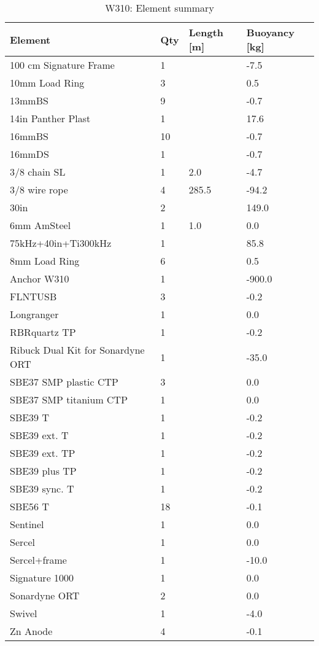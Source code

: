 \documentclass{article}
\begin{document}
\begin{table}[!htbp]
\centering
\caption{W310: Element summary}
\begin{tabular}{llll}
\toprule
Element & Qty & Length [m] & Buoyancy [kg] \\
\midrule
100 cm Signature Frame & 1 &  & -7.5 \\
10mm Load Ring & 3 &  & 0.5 \\
13mmBS & 9 &  & -0.7 \\
14in Panther Plast & 1 &  & 17.6 \\
16mmBS & 10 &  & -0.7 \\
16mmDS & 1 &  & -0.7 \\
3/8 chain SL & 1 & 2.0 & -4.7 \\
3/8 wire rope & 4 & 285.5 & -94.2 \\
30in & 2 &  & 149.0 \\
6mm AmSteel & 1 & 1.0 & 0.0 \\
75kHz+40in+Ti300kHz & 1 &  & 85.8 \\
8mm Load Ring & 6 &  & 0.5 \\
Anchor W310 & 1 &  & -900.0 \\
FLNTUSB & 3 &  & -0.2 \\
Longranger & 1 &  & 0.0 \\
RBRquartz TP & 1 &  & -0.2 \\
Ribuck Dual Kit for Sonardyne ORT & 1 &  & -35.0 \\
SBE37 SMP plastic CTP & 3 &  & 0.0 \\
SBE37 SMP titanium CTP & 1 &  & 0.0 \\
SBE39 T & 1 &  & -0.2 \\
SBE39 ext. T & 1 &  & -0.2 \\
SBE39 ext. TP & 1 &  & -0.2 \\
SBE39 plus TP & 1 &  & -0.2 \\
SBE39 sync. T & 1 &  & -0.2 \\
SBE56 T & 18 &  & -0.1 \\
Sentinel & 1 &  & 0.0 \\
Sercel & 1 &  & 0.0 \\
Sercel+frame & 1 &  & -10.0 \\
Signature 1000 & 1 &  & 0.0 \\
Sonardyne ORT & 2 &  & 0.0 \\
Swivel & 1 &  & -4.0 \\
Zn Anode & 4 &  & -0.1 \\
\bottomrule
\end{tabular}
\end{table}
\end{document}
